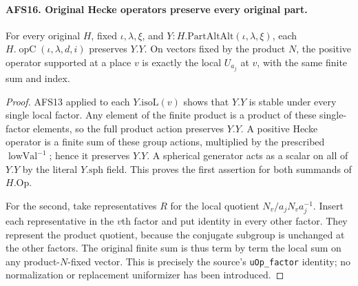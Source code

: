 \documentclass[11pt,a4paper]{article}
\numberwithin{equation}{section}
\theoremstyle{remark}\newtheorem{remark}[theorem]{Remark}
\begin{document}
\paragraph{AFS16. Original Hecke operators preserve every original part.}
\label{claim:AFS16}
For every original $H$, fixed $\iota,\lambda,\xi$, and
$Y:H.\mathrm{PartAltAlt}(\iota,\lambda,\xi)$, each
$H.\operatorname{opC}(\iota,\lambda,d,i)$ preserves $Y.Y$.
On vectors fixed by the product $N$, the positive operator
supported at a place $v$ is exactly the local $U_{a_j}$
at $v$, with the same finite sum and index.
\begin{proof}
AFS13 applied to each $Y.\mathrm{isoL}(v)$ shows that
$Y.Y$ is stable under every single local factor.  Any
element of the finite product is a product of these
single-factor elements, so the full product action
preserves $Y.Y$.  A positive Hecke operator is a finite
sum of these group actions, multiplied by the prescribed
$\operatorname{lowVal}^{-1}$; hence it preserves $Y.Y$.
A spherical generator acts as a scalar on all of $Y.Y$
by the literal $Y.\mathrm{sph}$ field.  This proves the
first assertion for both summands of $H.\mathrm{Op}$.

For the second, take representatives $R$ for the local
quotient $N_v/a_jN_va_j^{-1}$.  Insert each representative
in the $v$th factor and put identity in every other factor.
They represent the product quotient, because the conjugate
subgroup is unchanged at the other factors.  The original
finite sum is thus term by term the local sum on any
product-$N$-fixed vector.  This is precisely the source's
\texttt{u\allowbreak Op\_\allowbreak factor} identity; no normalization or
replacement uniformizer has been introduced.
\end{proof}

\end{document}
